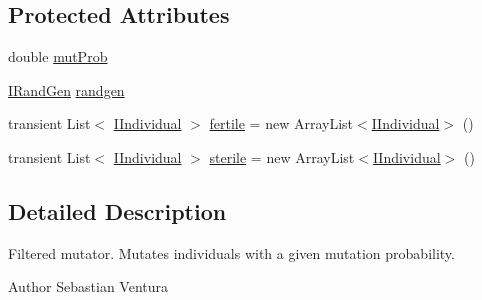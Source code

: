 \subsection*{Protected Attributes}
\begin{DoxyCompactItemize}
\item 
double \hyperlink{classnet_1_1sf_1_1jclec_1_1base_1_1_filtered_mutator_ac5ca6f680430f923bc7e92a7de095721}{mut\-Prob}
\item 
\hyperlink{interfacenet_1_1sf_1_1jclec_1_1util_1_1random_1_1_i_rand_gen}{I\-Rand\-Gen} \hyperlink{classnet_1_1sf_1_1jclec_1_1base_1_1_filtered_mutator_a846465d238479e38f6a752eed781cc2b}{randgen}
\item 
transient List$<$ \hyperlink{interfacenet_1_1sf_1_1jclec_1_1_i_individual}{I\-Individual} $>$ \hyperlink{classnet_1_1sf_1_1jclec_1_1base_1_1_filtered_mutator_aac6607c708d1937e2048a190da3d9b8b}{fertile} = new Array\-List$<$\hyperlink{interfacenet_1_1sf_1_1jclec_1_1_i_individual}{I\-Individual}$>$ ()
\item 
transient List$<$ \hyperlink{interfacenet_1_1sf_1_1jclec_1_1_i_individual}{I\-Individual} $>$ \hyperlink{classnet_1_1sf_1_1jclec_1_1base_1_1_filtered_mutator_a71f85310ce71199fa74922a7ed4d8088}{sterile} = new Array\-List$<$\hyperlink{interfacenet_1_1sf_1_1jclec_1_1_i_individual}{I\-Individual}$>$ ()
\end{DoxyCompactItemize}


\subsection{Detailed Description}
Filtered mutator. Mutates individuals with a given mutation probability.

\begin{DoxyAuthor}{Author}
Sebastian Ventura 
\end{DoxyAuthor}


